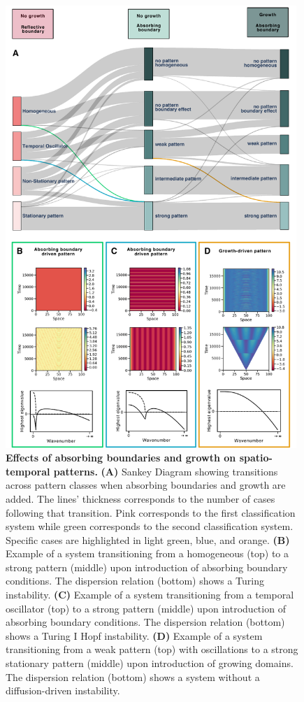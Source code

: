 \documentclass[10pt,letterpaper]{article}
\begin{document}
\begin{figure}[H]
    \includegraphics[width=11cm]{figures/boundaries_growth} %
    \vspace{2pt}
    \caption{\textbf{Effects of absorbing boundaries and growth on spatio-temporal patterns.} \textbf{(A)} Sankey Diagram showing transitions across pattern classes when absorbing boundaries and growth are added. The lines' thickness corresponds to the number of cases following that transition. Pink corresponds to the first classification system while green corresponds to the second classification system. Specific cases are highlighted in light green, blue, and orange. \textbf{(B)} Example of a system transitioning from a homogeneous (top) to a strong pattern (middle) upon introduction of absorbing boundary conditions. The dispersion relation (bottom) shows a Turing instability. \textbf{(C)} Example of a system transitioning from a temporal oscillator (top) to a strong pattern (middle) upon introduction of absorbing boundary conditions. The dispersion relation (bottom) shows a Turing I Hopf instability. \textbf{(D)} Example of a system transitioning from a weak pattern (top) with oscillations to a strong stationary pattern (middle) upon introduction of growing domains. The dispersion relation (bottom) shows a system without a diffusion-driven instability.}
    \label{fig:boundariesgrowth}
\end{figure}
\end{document}
